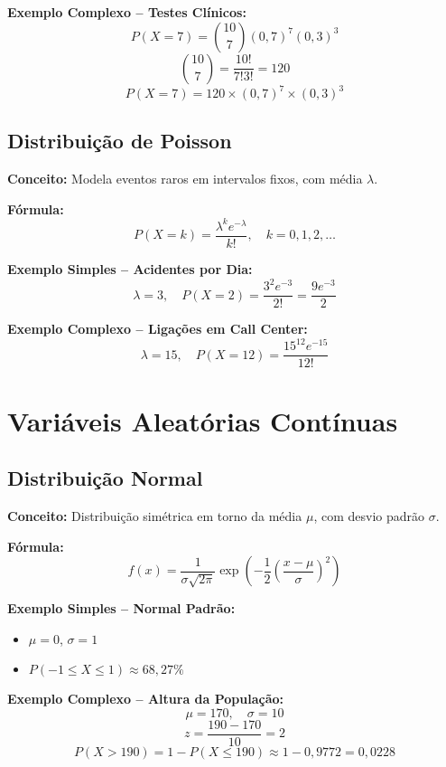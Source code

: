 \documentclass[a4paper,12pt]{article}
\begin{document}
\textbf{Exemplo Complexo – Testes Clínicos:}
\[
P(X = 7) = \binom{10}{7} (0{,}7)^7 (0{,}3)^3
\]
\[
\binom{10}{7} = \frac{10!}{7!3!} = 120
\]
\[
P(X = 7) = 120 \times (0{,}7)^7 \times (0{,}3)^3
\]

\subsection{Distribuição de Poisson}

\textbf{Conceito:} Modela eventos raros em intervalos fixos, com média \( \lambda \).

\textbf{Fórmula:}
\begin{equation}
P(X = k) = \frac{\lambda^k e^{-\lambda}}{k!}, \quad k = 0, 1, 2, \dots
\end{equation}

\textbf{Exemplo Simples – Acidentes por Dia:}
\[
\lambda = 3, \quad P(X = 2) = \frac{3^2 e^{-3}}{2!} = \frac{9 e^{-3}}{2}
\]

\textbf{Exemplo Complexo – Ligações em Call Center:}
\[
\lambda = 15, \quad P(X = 12) = \frac{15^{12} e^{-15}}{12!}
\]

\section{Variáveis Aleatórias Contínuas}

\subsection{Distribuição Normal}

\textbf{Conceito:} Distribuição simétrica em torno da média \( \mu \), com desvio padrão \( \sigma \).

\textbf{Fórmula:}
\begin{equation}
f(x) = \frac{1}{\sigma \sqrt{2 \pi}} \exp \left( -\frac{1}{2} \left( \frac{x - \mu}{\sigma} \right)^2 \right)
\end{equation}

\textbf{Exemplo Simples – Normal Padrão:}
\begin{itemize}
    \item \( \mu = 0 \), \( \sigma = 1 \)
    \item \( P(-1 \leq X \leq 1) \approx 68{,}27\% \)
\end{itemize}

\textbf{Exemplo Complexo – Altura da População:}
\[
\mu = 170, \quad \sigma = 10
\]
\[
z = \frac{190 - 170}{10} = 2
\]
\[
P(X > 190) = 1 - P(X \leq 190) \approx 1 - 0{,}9772 = 0{,}0228
\]
\end{document}
